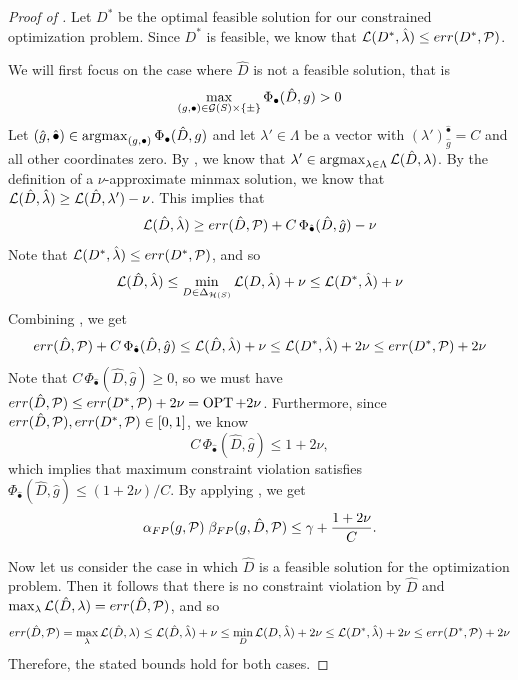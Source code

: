 \begin{proof}[Proof of ]
  Let $D^*$ be the optimal feasible solution for our constrained
  optimization problem.  Since $D^*$ is feasible, we know that
  $\mathcal{L}(D^*, \hat \lambda) \leq err(D^*, \mathcal{P})$.


  We will first focus on the case where $\hat D$ is not a feasible
  solution, that is
  $$\max_{(g, \bullet) \in \mathcal{G}(S) \times \{\pm\}} \Phi_\bullet(\hat D, g) > 0$$ Let
  $(\hat g, \hat \bullet)\in \operatorname*{\mathrm{argmax}}_{(g, \bullet)} \Phi_\bullet(\hat
  D, g)$ and let $\lambda'\in \Lambda$ be a vector with
  $(\lambda')_{\hat g}^{\hat \bullet} = C$ and all other coordinates
  zero. By , we know that
  $\lambda' \in \operatorname*{\mathrm{argmax}}_{\lambda\in \Lambda} \mathcal{L}(\hat D, \lambda)$.
  By the definition of a $\nu$-approximate minmax solution, we
  know that
  $\mathcal{L}(\hat D, \hat \lambda) \geq \mathcal{L}(\hat D, \lambda') - \nu$. This
  implies that
  \begin{equation}\label{batman}
    \mathcal{L}(\hat D, \hat \lambda) \geq err(\hat D, \mathcal{P}) + C \, \Phi_{\hat \bullet}(\hat D, \hat g) -
    \nu
  \end{equation}
  Note that $\mathcal{L}(D^*, \hat \lambda) \leq err(D^*, \mathcal{P})$, and so
  \begin{equation}\label{superman}
    \mathcal{L}(\hat D, \hat \lambda) \leq \min_{D\in \Delta_{\mathcal{H}(S)}}\mathcal{L}(D, \hat
    \lambda) + \nu \leq \mathcal{L}(D^*, \hat
    \lambda) + \nu
\end{equation}
Combining , we get
  \[
    err(\hat D, \mathcal{P}) + C\, \Phi_{\hat \bullet}(\hat D, \hat g) \leq
    \mathcal{L}(\hat D, \hat \lambda) + \nu \leq \mathcal{L}(D^*, \hat \lambda) + 2\nu
    \leq err(D^*, \mathcal{P}) + 2\nu
  \]
  Note that $C\, \Phi_{\hat \bullet}(\hat D, \hat g) \geq 0$, so we
  must have $err(\hat D, \mathcal{P}) \leq err(D^*, \mathcal{P}) +2 \nu = \operatorname{OPT} + 2\nu$.
  Furthermore, since $err(\hat D, \mathcal{P}), err(D^*, \mathcal{P})\in [0, 1]$, we know
  \[
    C\, \Phi_{\hat \bullet}(\hat D, \hat g) \leq 1 + 2\nu,
  \]
  which implies that maximum constraint violation satisfies
  $\Phi_{\hat \bullet}(\hat D, \hat g) \leq (1+2\nu)/C$.
  By applying , we get
  \[
    \alpha_{FP}(g, \mathcal{P})\; \beta_{FP}(g, \hat D, \mathcal{P}) \leq \gamma + \frac{1 + 2\nu}{C}.
  \]


  Now let us consider the case in which $\hat D$ is a feasible
  solution for the optimization problem. Then it follows that there is
  no constraint violation by $\hat D$ and
  $\max_\lambda \mathcal{L}(\hat D, \lambda) = err(\hat D, \mathcal{P})$, and so
  \[
    err(\hat D, \mathcal{P}) = \max_\lambda \mathcal{L}(\hat D, \lambda) \leq \mathcal{L}(\hat
    D, \hat \lambda) + \nu \leq \min_{D} \mathcal{L}(D, \hat \lambda) + 2\nu
    \leq \mathcal{L}(D^*, \hat \lambda) + 2\nu \leq err(D^*, \mathcal{P}) + 2\nu
  \]
  Therefore, the stated bounds hold for both cases.
\end{proof}


